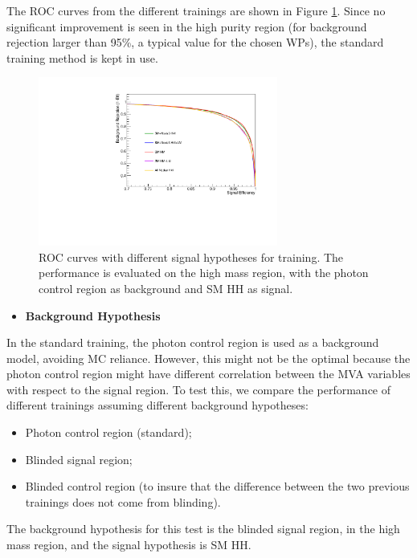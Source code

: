The ROC curves from the different trainings are shown in Figure \ref{fig:mva_cc_signal}. 
Since no significant improvement is seen in the high purity region (for background rejection larger than 95\%, a typical value for the chosen WPs), the standard training method is kept in use. 

\begin{figure}[thb]
  \centering
  \includegraphics[width=0.7\textwidth]{figures/sec-cats/mva/ROC}\hfil
  \caption{ROC curves with different signal hypotheses for training. The performance is evaluated on the high mass region, with the photon control region as background and SM HH as signal.}
  \label{fig:mva_cc_signal}
\end{figure}


\begin{itemize}
\item \textbf{Background Hypothesis}
\end{itemize}

In the standard training, the photon control region is used as a background model, avoiding MC reliance. 
However, this might not be the optimal because the photon control region might have different correlation between the MVA variables with respect to the signal region. 
To test this, we compare the performance of different trainings assuming different background hypotheses: 
\begin{itemize}
\item Photon control region (standard);
\item Blinded signal region;
\item Blinded control region (to insure that the difference between the two previous trainings does not come from blinding).
\end{itemize}
The background hypothesis for this test is the blinded signal region, in the high mass region, and the signal hypothesis is SM HH. 

